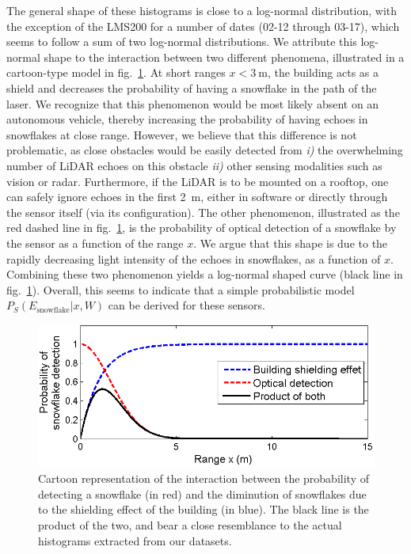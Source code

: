 The general shape of these histograms is close to a log-normal distribution, with the exception of the LMS200 for a number of dates (02-12 through 03-17), which seems to follow a sum of two log-normal distributions. We attribute this log-normal shape to the interaction between two different phenomena, illustrated in a cartoon-type model in fig.~\ref{fig:CartoonModel}. At short ranges $x<\SI{3}{\meter}$, the building acts as a shield and decreases the probability of having a snowflake in the path of the laser. We recognize that this phenomenon would be most likely absent on an autonomous vehicle, thereby increasing the probability of having echoes in snowflakes at close range. However, we believe that this difference is not problematic, as close obstacles would be easily detected from \emph{i)} the overwhelming number of  LiDAR echoes on this obstacle \emph{ii)} other sensing modalities such as vision or radar. Furthermore, if the LiDAR is to be mounted on a rooftop, one can safely  ignore echoes in the first \SI{2}{\meter}, either in software or directly through the sensor itself (via its configuration). The other phenomenon, illustrated as the red dashed line in fig.~\ref{fig:CartoonModel}, is the probability of optical detection of a snowflake by the sensor as a function of the range $x$. We argue that this shape is due to the rapidly decreasing light intensity of the echoes in snowflakes, as a function of $x$. Combining these two phenomenon yields a log-normal shaped curve (black line in fig.~\ref{fig:CartoonModel}). Overall, this seems to indicate that a simple probabilistic model $P_S(E_\text{snowflake}|x,W)$ can be derived for these sensors. 

\begin{figure}[th]
    \centering
    \includegraphics[width=0.97\linewidth]{./img/ShieldingModel.png}
    \caption{Cartoon representation of the interaction between the probability of detecting a snowflake (in red) and the diminution of snowflakes due to the shielding effect of the building (in blue). The black line is the product of the two, and bear a close resemblance to the actual histograms extracted from our datasets. }
    \label{fig:CartoonModel}
\end{figure}


